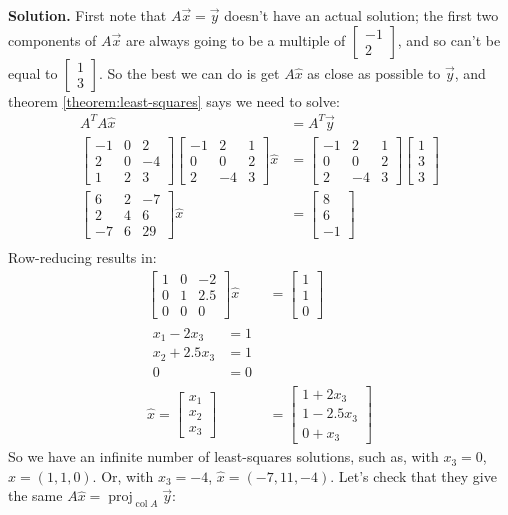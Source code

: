 \documentclass[11pt, letterpaper]{report}
\newenvironment{notes}{}{}
\newenvironment{book}{}{}
\newcounter{theorem}[chapter]
\DeclareMathOperator{\col}{col}
\DeclareMathOperator{\proj}{proj}
\newcommand{\bbvec}[2]{
  \begin{bmatrix} #1 \\ #2 \end{bmatrix}
}
\newcommand{\bbbvec}[3]{
  \begin{bmatrix} #1 \\ #2 \\ #3 \end{bmatrix}
}
\begin{document}
\begin{notes}
\vfill
\newpage
\end{notes}

\begin{book}
\textbf{Solution.} First note that $A\vec{x}=\vec{y}$ doesn't have an actual solution; the first two components of $A\vec{x}$ are always going to be a multiple of $\bbvec{-1}{2}$, and so can't be equal to $\bbvec{1}{3}$. So the best we can do is get $A\hat{x}$ as close as possible to $\vec{y}$, and theorem \ref{theorem:least-squares} says we need to solve:
\begin{align*}
A^TA\hat{x}&=A^T\vec{y} \\
\begin{bmatrix}
-1 & 0 & 2 \\
2 &0 & -4 \\
1 & 2 & 3
\end{bmatrix}\begin{bmatrix} 
-1 & 2 & 1 \\
0 & 0 & 2 \\
2 & -4 & 3
\end{bmatrix}\hat{x} &= \begin{bmatrix}
-1 & 2 & 1 \\
0 & 0 & 2 \\
2 & -4 & 3
\end{bmatrix}\bbbvec{1}{3}{3} \\
\begin{bmatrix}
6 & 2 & -7 \\
2 & 4 & 6 \\
-7 & 6 & 29
\end{bmatrix}\hat{x} & = \bbbvec{8}{6}{-1} \\
\end{align*}
Row-reducing results in:
\begin{align*}
\begin{bmatrix}
1 & 0 & -2 \\
0 & 1 & 2.5 \\
0 & 0 & 0
\end{bmatrix}\hat{x} &= \bbbvec{1}{1}{0} \\
\begin{aligned}
x_1-2x_3&=1 \\
x_2+2.5x_3&=1 \\
0 &= 0
\end{aligned} \\
\hat{x} = \bbbvec{x_1}{x_2}{x_3} &= \bbbvec{1+2x_3}{1-2.5x_3}{0+x_3}
\end{align*}
So we have an infinite number of least-squares solutions, such as, with $x_3=0$, $\hat{x}=(1,1,0)$. Or, with $x_3=-4$, $\hat{x}=(-7,11,-4)$. Let's check that they give the same $A\hat{x}=\proj_{\col A} \vec{y}$:

\end{book}
\end{document}
